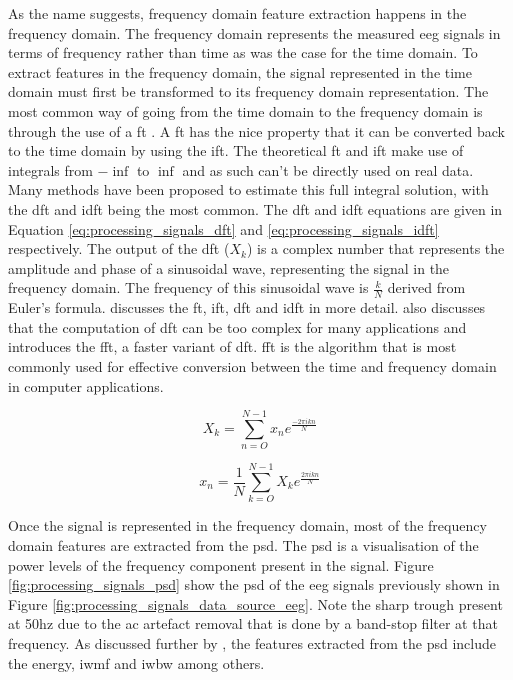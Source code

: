 As the name suggests, frequency domain feature extraction happens in the frequency domain.
The frequency domain represents the measured \gls{eeg} signals in terms of frequency rather than time as was the case for the time domain.
To extract features in the frequency domain, the signal represented in the time domain must first be transformed to its frequency domain representation.
The most common way of going from the time domain to the frequency domain is through the use of a \gls{ft} \citep{fourier_transform}.
A  \gls{ft} has the nice property that it can be converted back to the time domain by using the \gls{ift}.
The theoretical \gls{ft} and \gls{ift} make use of integrals from $-\inf$ to $\inf$ and as such can't be directly used on real data.
Many methods have been proposed to estimate this full integral solution, with the \gls{dft} and \gls{idft} being the most common.
The \gls{dft} and \gls{idft} equations are given in Equation \ref{eq:processing_signals_dft} and \ref{eq:processing_signals_idft} respectively.
The output of the \gls{dft} ($X_k$) is a complex number that represents the amplitude and phase of a sinusoidal wave, representing the signal in the frequency domain.
The frequency of this sinusoidal wave is $\frac{k}{N}$ derived from Euler's formula.
 discusses the \gls{ft}, \gls{ift}, \gls{dft} and \gls{idft} in more detail.
 also discusses that the computation of \gls{dft} can be too complex for many applications and introduces the \gls{fft}, a faster variant of \gls{dft}.
\Gls{fft} is the algorithm that is most commonly used for effective conversion between the time and frequency domain in computer applications.

\begin{equation}
    \label{eq:processing_signals_dft}
    X_k = \sum_{n=O}^{N-1} x_n e^{\frac{-2 \pi i k n}{N}}
\end{equation}

\begin{equation}
    \label{eq:processing_signals_idft}
    x_n = \frac{1}{N} \sum_{k=O}^{N-1} X_k e^{\frac{2 \pi i k n}{N}}
\end{equation}

Once the signal is represented in the frequency domain, most of the frequency domain features are extracted from the \gls{psd}.
The \gls{psd} is a visualisation of the power levels of the frequency component present in the signal.
Figure \ref{fig:processing_signals_psd} show the \gls{psd} of the \gls{eeg} signals previously shown in  Figure \ref{fig:processing_signals_data_source_eeg}.
Note the sharp trough present at 50\gls{hz} due to the \gls{ac} artefact removal that is done by a band-stop filter at that frequency.
As discussed further by \citet{eeg_features}, the features extracted from the \gls{psd} include the energy, \gls{iwmf} and \gls{iwbw} among others.


